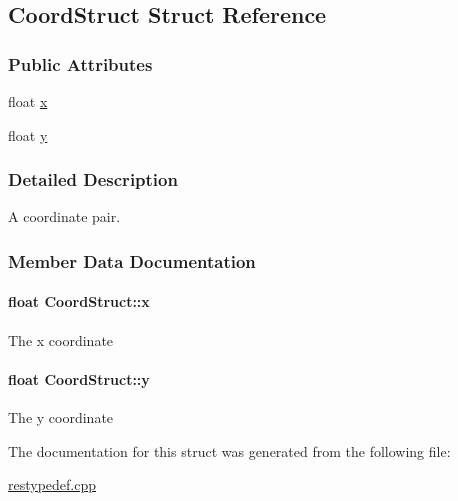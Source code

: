 \hypertarget{struct_coord_struct}{}\subsection{Coord\+Struct Struct Reference}
\label{struct_coord_struct}
\subsubsection*{Public Attributes}
\begin{DoxyCompactItemize}
\item 
float \hyperlink{struct_coord_struct_a183d7226fc5a8470ce9b9f04f9cb69bb}{x}
\item 
float \hyperlink{struct_coord_struct_a1a5966a881bc3e76e9becf00639585ac}{y}
\end{DoxyCompactItemize}


\subsubsection{Detailed Description}
A coordinate pair. 

\subsubsection{Member Data Documentation}
\paragraph[{\texorpdfstring{x}{x}}]{\setlength{\rightskip}{0pt plus 5cm}float Coord\+Struct\+::x}\hypertarget{struct_coord_struct_a183d7226fc5a8470ce9b9f04f9cb69bb}{}\label{struct_coord_struct_a183d7226fc5a8470ce9b9f04f9cb69bb}
The x coordinate 
\paragraph[{\texorpdfstring{y}{y}}]{\setlength{\rightskip}{0pt plus 5cm}float Coord\+Struct\+::y}\hypertarget{struct_coord_struct_a1a5966a881bc3e76e9becf00639585ac}{}\label{struct_coord_struct_a1a5966a881bc3e76e9becf00639585ac}
The y coordinate 

The documentation for this struct was generated from the following file\+:\begin{DoxyCompactItemize}
\item 
\hyperlink{restypedef_8cpp}{restypedef.\+cpp}\end{DoxyCompactItemize}
